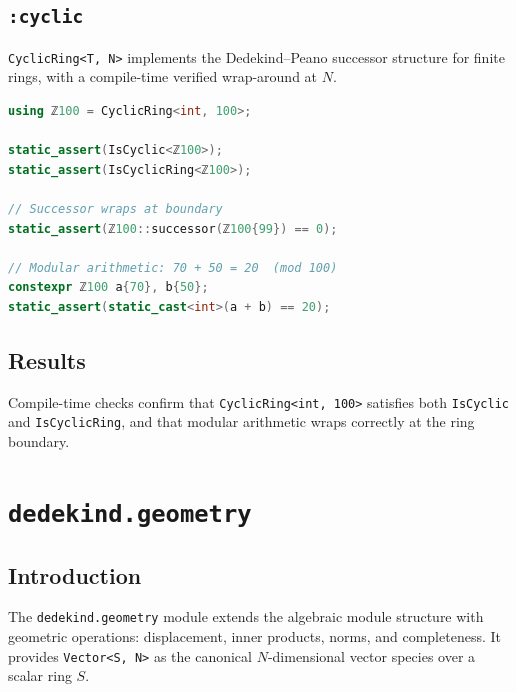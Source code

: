 \documentclass[11pt, a4paper]{report}
\begin{document}
\section{\texttt{:cyclic}}
\label{sec:morphologies-cyclic}

\texttt{CyclicRing<T, N>} implements the Dedekind--Peano successor structure for finite rings, with a compile-time verified wrap-around at $N$.

\begin{lstlisting}[language=C++, caption={Morphologies: cyclic ring wrap-around (from \texttt{cyclic\_test.cpp}).}, label={lst:morphologies-cyclic}]
using ℤ100 = CyclicRing<int, 100>;

static_assert(IsCyclic<ℤ100>);
static_assert(IsCyclicRing<ℤ100>);

// Successor wraps at boundary
static_assert(ℤ100::successor(ℤ100{99}) == 0);

// Modular arithmetic: 70 + 50 = 20  (mod 100)
constexpr ℤ100 a{70}, b{50};
static_assert(static_cast<int>(a + b) == 20);
\end{lstlisting}

\section{Results}

Compile-time checks confirm that \texttt{CyclicRing<int, 100>} satisfies both \texttt{IsCyclic} and \texttt{IsCyclicRing}, and that modular arithmetic wraps correctly at the ring boundary.


\chapter{\texttt{dedekind.geometry}}
\label{chap:geometry}

\section{Introduction}

The \texttt{dedekind.geometry} module extends the algebraic module structure with geometric operations: displacement, inner products, norms, and completeness.
It provides \texttt{Vector<S, N>} as the canonical $N$-dimensional vector species over a scalar ring $S$.
\end{document}
